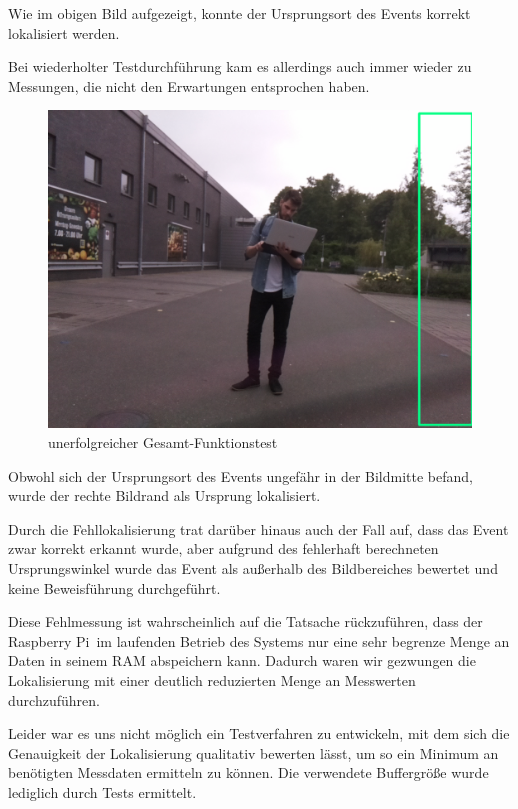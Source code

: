 Wie im obigen Bild aufgezeigt, konnte der Ursprungsort des Events korrekt lokalisiert werden. 

Bei wiederholter Testdurchführung kam es allerdings auch immer wieder zu Messungen, die nicht den Erwartungen entsprochen haben.

\begin{figure}[h]
	\begin{center}
		\includegraphics[scale=0.1]{Sections/Tests/Test_8}
	\end{center}
	\caption{unerfolgreicher Gesamt-Funktionstest}
	\label{fig:Test_8}
\end{figure}

Obwohl sich der Ursprungsort des Events ungefähr in der Bildmitte befand, wurde der rechte Bildrand als Ursprung lokalisiert. 

Durch die Fehllokalisierung trat darüber hinaus auch der Fall auf, dass das Event zwar korrekt erkannt wurde, aber aufgrund des fehlerhaft berechneten Ursprungswinkel wurde das Event als außerhalb des Bildbereiches bewertet und keine Beweisführung durchgeführt. 

Diese Fehlmessung ist wahrscheinlich auf die Tatsache rückzuführen, dass der \glqq Raspberry Pi\grqq\ im laufenden Betrieb des Systems nur eine sehr begrenze Menge an Daten in seinem RAM abspeichern kann. Dadurch waren wir gezwungen die Lokalisierung mit einer deutlich reduzierten Menge an Messwerten durchzuführen. 

Leider war es uns nicht möglich ein Testverfahren zu entwickeln, mit dem sich die Genauigkeit der Lokalisierung qualitativ bewerten lässt, um so ein Minimum an benötigten Messdaten ermitteln zu können. Die verwendete Buffergröße wurde lediglich durch Tests ermittelt.


